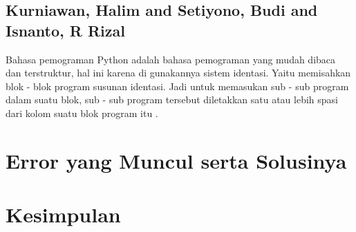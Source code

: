 \documentclass[12pt]{article}
\begin{document}
\subsection{Kurniawan, Halim and Setiyono, Budi and Isnanto, R Rizal}
Bahasa pemograman Python adalah bahasa pemograman yang mudah dibaca dan terstruktur, hal ini karena di gunakannya sistem identasi. Yaitu memisahkan blok - blok program susunan identasi. Jadi untuk memasukan sub - sub program dalam suatu blok, sub - sub program tersebut diletakkan satu atau lebih spasi dari kolom suatu blok program itu \cite{kurniawan2011aplikasi}.

\section{Error yang Muncul serta Solusinya}


\section{Kesimpulan}
\end{document}
